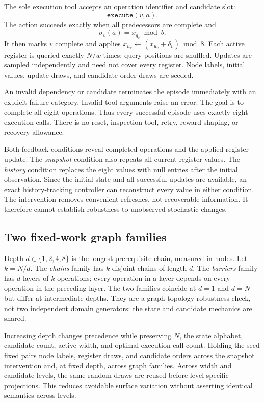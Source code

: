 \documentclass[sigconf,nonacm]{acmart}
\begin{document}
The sole execution tool accepts an operation identifier and candidate slot:
\[
 \texttt{execute}(v,a).
\]
The action succeeds exactly when all predecessors are complete and
\[
 \sigma_v(a)=x_{q_v}\bmod b.
\]
It then marks $v$ complete and applies
$x_{u_v}\leftarrow(x_{u_v}+\delta_v)\bmod8$. Each active register is queried
exactly $N/w$ times; query positions are shuffled. Updates are sampled
independently and need not cover every register. Node labels, initial
values, update draws, and candidate-order draws are seeded.

An invalid dependency or candidate terminates the episode immediately with
an explicit failure category. Invalid tool arguments raise an error.
The goal is to complete all eight operations. Thus every successful
episode uses exactly eight execution calls. There is no reset, inspection
tool, retry, reward shaping, or recovery allowance.

Both feedback conditions reveal completed operations and the applied
register update. The \emph{snapshot} condition also repeats all current
register values. The \emph{history} condition replaces the eight values
with null entries after the initial observation. Since the initial state
and all successful updates are available, an exact history-tracking
controller can reconstruct every value in either condition. The
intervention removes convenient refreshes, not recoverable information.
It therefore cannot establish robustness to unobserved stochastic changes.

\subsection{Two fixed-work graph families}
Depth $d\in\{1,2,4,8\}$ is the longest prerequisite chain, measured in nodes.
Let $k=N/d$. The \emph{chains} family has $k$ disjoint chains of length $d$.
The \emph{barriers} family has $d$ layers of $k$ operations; every operation
in a layer depends on every operation in the preceding layer.
The two families coincide at $d=1$ and $d=N$ but differ at intermediate
depths. They are a graph-topology robustness check, not two independent
domain generators: the state and candidate mechanics are shared.

Increasing depth changes precedence while preserving $N$, the state
alphabet, candidate count, active width, and optimal execution-call count.
Holding the seed fixed pairs node labels, register draws, and candidate
orders across the snapshot intervention and, at fixed depth, across
graph families. Across width and candidate levels, the same random draws
are reused before level-specific projections. This reduces avoidable
surface variation without asserting identical semantics across levels.
\end{document}

